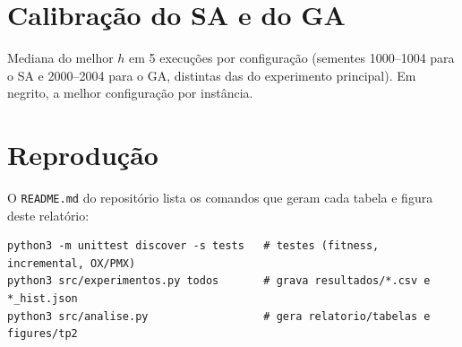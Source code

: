 \section{Calibração do SA e do GA}
\label{anexo:calib}

Mediana do melhor $h$ em 5 execuções por configuração (sementes
\numrange{1000}{1004} para o SA e \numrange{2000}{2004} para o GA, distintas
das do experimento principal). Em negrito, a melhor configuração por
instância.

\begin{table}[H]
    \centering
    \caption{Calibração do SA ($\chi_0$: aceitação inicial da piora média;
    $T_f$: temperatura final).}
    
\end{table}

\begin{table}[H]
    \centering
    \caption{Calibração do GA ($P_c=0{,}9$, torneio 3, elitismo 2, OX).}
    
\end{table}

\section{Reprodução}

O \texttt{README.md} do repositório lista os comandos que geram cada tabela e
figura deste relatório:
\begin{verbatim}
python3 -m unittest discover -s tests   # testes (fitness, incremental, OX/PMX)
python3 src/experimentos.py todos       # grava resultados/*.csv e *_hist.json
python3 src/analise.py                  # gera relatorio/tabelas e figures/tp2
\end{verbatim}
